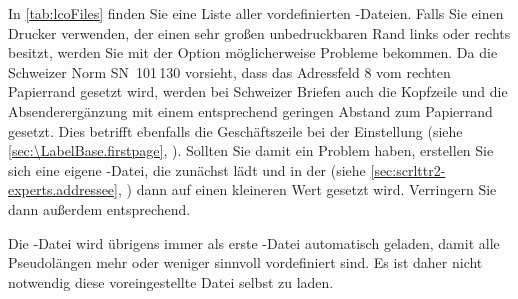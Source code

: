 In \autoref{tab:lcoFiles} finden Sie eine Liste aller vordefinierten
-Dateien. Falls Sie einen Drucker verwenden, der
einen sehr großen unbedruckbaren Rand links oder rechts besitzt, werden Sie
mit der Option  möglicherweise Probleme
bekommen. Da die Schweizer Norm SN~101\,130 vorsieht, dass das Adressfeld
8 vom rechten Papierrand gesetzt wird, werden bei Schweizer Briefen
auch die Kopfzeile und die Absenderergänzung mit einem entsprechend geringen
Abstand zum Papierrand gesetzt. Dies betrifft ebenfalls die Geschäftszeile bei
der Einstellung
%
(siehe \autoref{sec:\LabelBase.firstpage},
). Sollten Sie damit
ein Problem haben, erstellen Sie sich eine eigene -Datei, die
zunächst  lädt und in der
 (siehe
\autoref{sec:scrlttr2-experts.addressee},
) dann auf einen kleineren
Wert gesetzt wird.  Verringern Sie dann außerdem
entsprechend.%

Die\label{tipp:\LabelBase.DIN} -Datei
 wird übrigens immer als erste
-Datei automatisch geladen, damit alle Pseudolängen mehr oder
weniger sinnvoll vordefiniert sind. Es ist daher nicht notwendig diese
voreingestellte Datei selbst zu laden.

